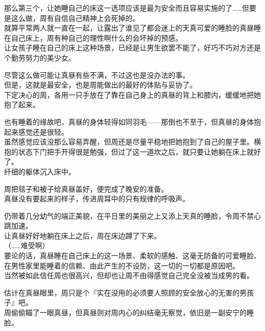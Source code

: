 那么第三个，让她睡自己的床这一选项应该是最为安全而且容易实施的了……但要是这么做，周有自信自己精神上会死掉的。\\

就算平常两人就一直在一起，让露出了谁见了都会迷上的天真可爱的睡脸的真昼睡在自己床上，周有种自己的理性啊什么的会坏掉的预感。\\

让女孩子睡在自己的床上这种场景，已经是让男生欲罢不能了，好巧不巧对方还是个勤劳努力的美少女。

尽管这么做可能让真昼有些不满，不过这也是没办法的事。\\

但是，这就是最安全，也是周能做出的最好的体贴与妥协了。\\

下定决心的周，各用一只手放在了靠在自己身上的真昼的背上和膝内，缓缓地把她抱了起来。

也有睡着的缘故吧，真昼的身体轻得如同羽毛——那倒也不至于，但真昼的身体抱起来感觉还是很轻。\\

虽然感觉应该没那么容易弄醒，但周还是尽量平稳地把她抱到了自己的屋子里。横抱的状态下门把手开得很是勉强，但过了这一道坎之后，就只要让她躺在床上就好了。\\

纤细的躯体沉入床中。

周把毯子和被子给真昼盖好，便完成了晚安的准备。\\

真昼没有要起来的样子，传进周耳中的只有规律的呼吸声。

仍带着几分幼气的端正美貌，在平日里的美丽之上又添上天真的睡脸，令周不禁心跳加速。\\

让真昼好好地躺在床上之后，周在床边蹲了下来。\\

（……难受啊）\\

要论的话，真昼睡在自己床上的这一场景、柔软的感触、这毫无防备的可爱睡脸、在男性家里能睡着的信赖、由此产生的不设防，这一切的一切都是原因吧。\\

当然被如此信任周也很高兴，但却也让周不由得感觉自己完全没被当成男的看。

估计在真昼眼里，周只是个『实在没用的必须要人照顾的安全放心的无害的男孩子』吧。\\

周偷偷瞄了一眼真昼，但真昼则对周内心的纠结毫无察觉，依旧是一副安宁的睡脸。\\

